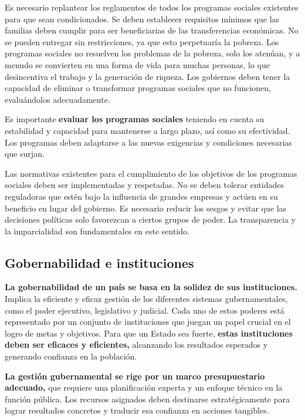 \documentclass[
  letterpaper,
  DIV=11,
  numbers=noendperiod]{scrartcl}
\begin{document}
Es necesario replantear los reglamentos de todos los programas sociales
existentes para que sean condicionados. Se deben establecer requisitos
mínimos que las familias deben cumplir para ser beneficiarias de las
transferencias económicas. No se pueden entregar sin restricciones, ya
que esto perpetuaría la pobreza. Los programas sociales no resuelven los
problemas de la pobreza, solo los atenúan, y a menudo se convierten en
una forma de vida para muchas personas, lo que desincentiva el trabajo y
la generación de riqueza. Los gobiernos deben tener la capacidad de
eliminar o transformar programas sociales que no funcionen, evaluándolos
adecuadamente.

Es importante \textbf{evaluar los programas sociales} teniendo en cuenta
su estabilidad y capacidad para mantenerse a largo plazo, así como su
efectividad. Los programas deben adaptarse a las nuevas exigencias y
condiciones necesarias que surjan.

Las normativas existentes para el cumplimiento de los objetivos de los
programas sociales deben ser implementadas y respetadas. No se deben
tolerar entidades reguladoras que estén bajo la influencia de grandes
empresas y actúen en su beneficio en lugar del gobierno. Es necesario
reducir los sesgos y evitar que las decisiones políticas solo favorezcan
a ciertos grupos de poder. La transparencia y la imparcialidad son
fundamentales en este sentido.

\hypertarget{gobernabilidad-e-instituciones}{%
\subsection{Gobernabilidad e
instituciones}\label{gobernabilidad-e-instituciones}}

\textbf{La gobernabilidad de un país se basa en la solidez de sus
instituciones.} Implica la eficiente y eficaz gestión de los diferentes
sistemas gubernamentales, como el poder ejecutivo, legislativo y
judicial. Cada uno de estos poderes está representado por un conjunto de
instituciones que juegan un papel crucial en el logro de metas y
objetivos. Para que un Estado sea fuerte, \textbf{estas instituciones
deben ser eficaces y eficientes,} alcanzando los resultados esperados y
generando confianza en la población.

\textbf{La gestión gubernamental se rige por un marco presupuestario
adecuado,} que requiere una planificación experta y un enfoque técnico
en la función pública. Los recursos asignados deben destinarse
estratégicamente para lograr resultados concretos y traducir esa
confianza en acciones tangibles.
\end{document}
